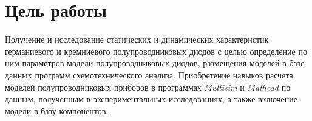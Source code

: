 \chapter{Цель работы}
Получение и исследование статических и динамических характеристик
германиевого и кремниевого полупроводниковых диодов с целью определение
по ним параметров модели полупроводниковых диодов, размещения моделей в
базе данных программ схемотехнического анализа. Приобретение навыков
расчета моделей полупроводниковых приборов в программах \textit{Multisim }и
\textit{Mathcad} по данным, полученным в экспериментальных исследованиях, а также
включение модели в базу компонентов.


